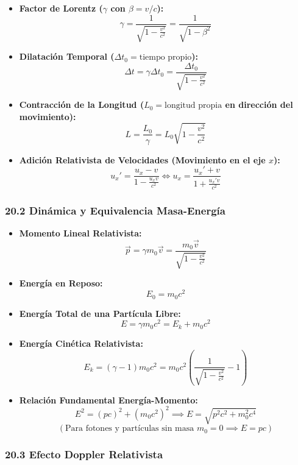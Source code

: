 \documentclass[11pt,a4paper]{article}
\begin{document}
\begin{itemize}
  \item \textbf{Factor de Lorentz ($\gamma$ con $\beta = v/c$):}
  \[
    \gamma = \frac{1}{\sqrt{1 - \frac{v^2}{c^2}}} = \frac{1}{\sqrt{1 - \beta^2}}
  \]
  \item \textbf{Dilatación Temporal ($\Delta t_0 = \text{tiempo propio}$):}
  \[
    \Delta t = \gamma \Delta t_0 = \frac{\Delta t_0}{\sqrt{1 - \frac{v^2}{c^2}}}
  \]
  \item \textbf{Contracción de la Longitud ($L_0 = \text{longitud propia}$ en dirección del movimiento):}
  \[
    L = \frac{L_0}{\gamma} = L_0 \sqrt{1 - \frac{v^2}{c^2}}
  \]
  \item \textbf{Adición Relativista de Velocidades (Movimiento en el eje $x$):}
  \[
    u_x' = \frac{u_x - v}{1 - \frac{u_x v}{c^2}} \iff u_x = \frac{u_x' + v}{1 + \frac{u_x' v}{c^2}}
  \]
\end{itemize}

\subsubsection*{20.2 Dinámica y Equivalencia Masa-Energía}

\begin{itemize}
  \item \textbf{Momento Lineal Relativista:}
  \[
    \vec{p} = \gamma m_0 \vec{v} = \frac{m_0 \vec{v}}{\sqrt{1 - \frac{v^2}{c^2}}}
  \]
  \item \textbf{Energía en Reposo:}
  \[
    E_0 = m_0 c^2
  \]
  \item \textbf{Energía Total de una Partícula Libre:}
  \[
    E = \gamma m_0 c^2 = E_k + m_0 c^2
  \]
  \item \textbf{Energía Cinética Relativista:}
  \[
    E_k = (\gamma - 1) m_0 c^2 = m_0 c^2 \left( \frac{1}{\sqrt{1 - \frac{v^2}{c^2}}} - 1 \right)
  \]
  \item \textbf{Relación Fundamental Energía-Momento:}
  \[
    E^2 = (p c)^2 + (m_0 c^2)^2 \implies E = \sqrt{p^2 c^2 + m_0^2 c^4}
  \]
  \[
    (\text{Para fotones y partículas sin masa } m_0 = 0 \implies E = p c)
  \]
\end{itemize}

\subsubsection*{20.3 Efecto Doppler Relativista}
\end{document}
